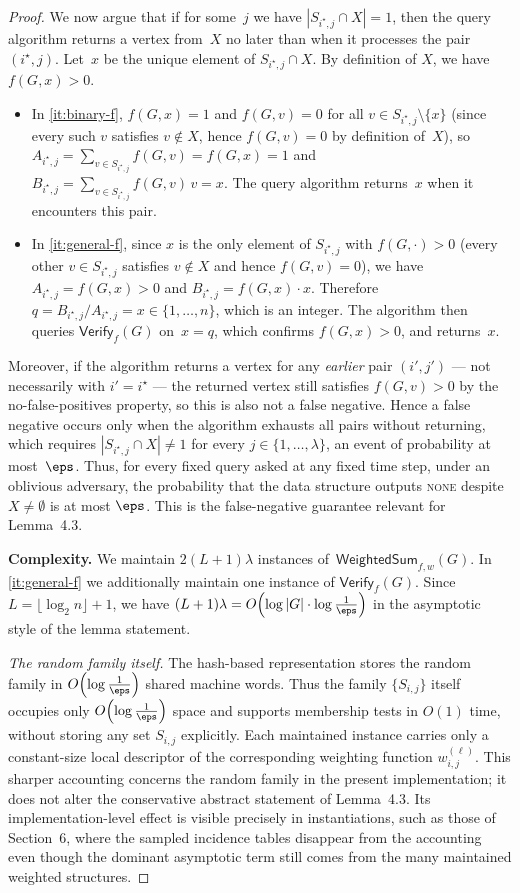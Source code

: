 \begin{proof}
We now argue that if for some~$j$ we have $|S_{i^\star,j}\cap X|=1$, then
the query algorithm returns a vertex from~$X$ no later than when it processes
the pair $(i^\star,j)$.
Let~$x$ be the unique element of $S_{i^\star,j}\cap X$.
By definition of $X$, we have $f(G,x)>0$.
\begin{itemize}
\item In \cref{it:binary-f}, $f(G,x)=1$ and $f(G,v)=0$ for all
$v\in S_{i^\star,j}\setminus\{x\}$
(since every such $v$ satisfies $v\notin X$, hence $f(G,v)=0$ by
definition of~$X$), so
$A_{i^\star,j}=\sum_{v\in S_{i^\star,j}}f(G,v)=f(G,x)=1$ and
$B_{i^\star,j}=\sum_{v\in S_{i^\star,j}}f(G,v)\,v=x$.
The query algorithm returns~$x$ when it encounters this pair.
\item In \cref{it:general-f}, since $x$ is the only element of
$S_{i^\star,j}$ with $f(G,\cdot)>0$ (every other $v\in S_{i^\star,j}$
satisfies $v\notin X$ and hence $f(G,v)=0$), we have
$A_{i^\star,j}=f(G,x)>0$ and $B_{i^\star,j}=f(G,x)\cdot x$.
Therefore $q = B_{i^\star,j}/A_{i^\star,j}=x\in\{1,\dots,n\}$,
which is an integer.
The algorithm then queries $\mathsf{Verify}_f(G)$ on~$x=q$,
which confirms $f(G,x)>0$, and returns~$x$.
\end{itemize}
Moreover, if the algorithm returns a vertex for any \emph{earlier} pair
$(i',j')$ --- not necessarily with $i'=i^\star$ --- the returned vertex still
satisfies $f(G,v)>0$ by the no-false-positives property, so this is also
not a false negative.
Hence a false negative occurs only when the algorithm exhausts all pairs
without returning, which requires
$|S_{i^\star,j}\cap X|\neq 1$ for every $j\in\{1,\dots,\lambda\}$, an event
of probability at most~$\eps$.
Thus, for every fixed query asked at any fixed time step, under an oblivious
adversary, the probability that the data structure outputs \textsc{none}
despite $X\neq\emptyset$ is at most $\eps$.
This is the false-negative guarantee relevant for Lemma~4.3.

\smallskip
\noindent\textbf{Complexity.}
We maintain $2(L+1)\lambda$ instances of~$\mathsf{WeightedSum}_{f,w}(G)$.
In \cref{it:general-f} we additionally maintain one instance of
$\mathsf{Verify}_f(G)$.
Since $L=\lfloor\log_2 n\rfloor+1$, we have $(L+1)\lambda =
O\!\left(\log|G|\cdot \log\frac{1}{\eps}\right)$ in the asymptotic style of the
lemma statement.

\emph{The random family itself.}
The hash-based representation stores the random family in
$O\!\left(\log\frac{1}{\eps}\right)$ shared machine words.
Thus the family $\{S_{i,j}\}$ itself occupies only
$O\!\left(\log\frac{1}{\eps}\right)$ space and supports membership tests in
$O(1)$ time, without storing any set $S_{i,j}$ explicitly.
Each maintained instance carries only a constant-size local descriptor of the
corresponding weighting function $w^{(\ell)}_{i,j}$.
This sharper accounting concerns the random family in the present
implementation; it does not alter the conservative abstract statement of
Lemma~4.3.
Its implementation-level effect is visible precisely in instantiations, such as
those of Section~6, where the sampled incidence tables disappear from the
accounting even though the dominant asymptotic term still comes from the many
maintained weighted structures.


\end{proof}
